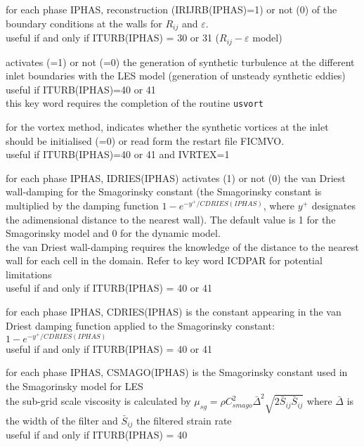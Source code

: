 {for each phase IPHAS, reconstruction (IRIJRB(IPHAS)=1) or not (0) of the
boundary conditions at the walls for $R_{ij}$ and  $\varepsilon$.\\
useful if and only if ITURB(IPHAS) = 30 or 31 ($R_{ij}-\varepsilon$ model)}



{activates (=1) or not (=0) the generation of synthetic turbulence at the
different inlet boundaries with the LES model (generation of unsteady synthetic
eddies)\\
useful if ITURB(IPHAS)=40 or 41\\
this key word requires the completion of the routine
\texttt{usvort}}

{for the vortex method, indicates whether the synthetic vortices at the inlet
should be initialised (=0) or read form the restart file FICMVO.\\
useful if ITURB(IPHAS)=40 or 41 and IVRTEX=1}


{for each phase IPHAS, IDRIES(IPHAS) activates (1) or not (0) the van
Driest wall-damping for the Smagorinsky constant (the Smagorinsky
constant is multiplied by the damping function
$1-e^{-y^+/CDRIES(IPHAS)}$, where $y^+$ designates the adimensional
distance to the nearest wall). The default value is 1 for the
Smagorinsky model and 0 for the dynamic model.\\
the van Driest wall-damping requires the knowledge of the distance to the
nearest wall for each cell in the domain. Refer to key word ICDPAR for potential
limitations\\
useful if and only if ITURB(IPHAS) = 40 or 41}

{for each phase IPHAS, CDRIES(IPHAS) is the constant appearing in the van Driest
damping function applied to the Smagorinsky constant: $1-e^{-y^+/CDRIES(IPHAS)}$\\
useful if and only if ITURB(IPHAS) = 40 or 41}

{for each phase IPHAS, CSMAGO(IPHAS) is the Smagorinsky constant used in
the Smagorinsky model for LES\\
the sub-grid scale viscosity is calculated by
 $\displaystyle\mu_{sg}=\rho C_{smago}^2\bar{\Delta}^2\sqrt{2\bar{S}_{ij}\bar{S}_{ij}}$
where $\bar{\Delta}$ is the width of the filter and $\bar{S}_{ij}$ the filtered
strain rate\\
useful if and only if ITURB(IPHAS) = 40}

